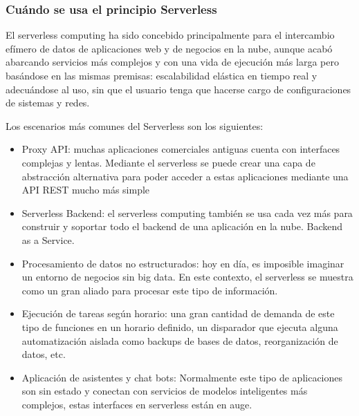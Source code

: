 \subsubsection{Cuándo se usa el principio Serverless}
El serverless computing ha sido concebido principalmente para el intercambio efímero de datos de aplicaciones web y de negocios en la nube, aunque acabó abarcando servicios más complejos y con una vida de ejecución más larga pero basándose en las mismas premisas: escalabilidad elástica en tiempo real y adecuándose al uso, sin que el usuario tenga que hacerse cargo de configuraciones de sistemas y redes.
\vspace{1em}
\par Los escenarios más comunes del Serverless son los siguientes:
\begin{itemize}
    \item Proxy API: muchas aplicaciones comerciales antiguas cuenta con interfaces complejas y lentas. Mediante el serverless se puede crear una capa de abstracción alternativa para poder acceder a estas aplicaciones mediante una API REST mucho más simple
    \item Serverless Backend: el serverless computing también se usa cada vez más para construir y soportar todo el backend de una aplicación en la nube. Backend as a Service.
    \item Procesamiento de datos no estructurados: hoy en día, es imposible imaginar un entorno de negocios sin big data. En este contexto, el serverless se muestra como un gran aliado para procesar este tipo de información.
    \item Ejecución de tareas según horario: una gran cantidad de demanda de este tipo de funciones en un horario definido, un disparador que ejecuta alguna automatización aislada como backups de bases de datos, reorganización de datos, etc.
    \item Aplicación de asistentes y chat bots: Normalmente este tipo de aplicaciones son sin estado y conectan con servicios de modelos inteligentes más complejos, estas interfaces en serverless están en auge.
\end{itemize}
